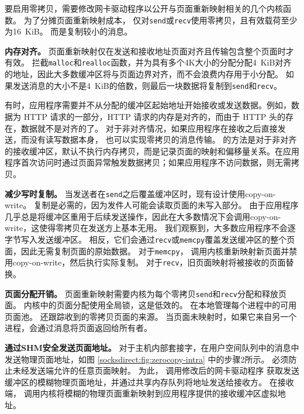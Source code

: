 

要启用零拷贝，需要修改网卡驱动程序以公开与页面重新映射相关的几个内核函数。
为了分摊页面重新映射成本，\libipc{} 仅对\texttt {send}或\texttt {recv}使用零拷贝，且有效载荷至少为16~KiB。
而是复制较小的消息。

\textbf {内存对齐。}
页面重新映射仅在发送和接收地址页面对齐且传输包含整个页面时才有效。
\libipc{} 拦截\texttt {malloc}和\texttt {realloc}函数，并为具有多个4K大小的分配分配4~KiB对齐的地址，因此大多数缓冲区将与页面边界对齐，而不会浪费内存用于小分配。
如果发送消息的大小不是4~KiB的倍数，则最后一块数据将复制到\texttt {send}和\texttt {recv}。

有时，应用程序需要并不从分配的缓冲区起始地址开始接收或发送数据。例如，数据为 HTTP 请求的一部分，HTTP 请求的内存是对齐的，而由于 HTTP 头的存在，数据就不是对齐的了。
对于非对齐情况，如果应用程序在接收之后直接发送，而没有读写数据本身，\sys{} 也可以实现零拷贝的消息传输。\sys{} 的方法是对于非对齐的接收缓冲区，默认不执行内存拷贝，而是记录页面的映射和偏移量关系。在应用程序首次访问时通过页面异常触发数据拷贝；如果应用程序不访问数据，则无需拷贝。



\textbf{减少写时复制。}
当发送者在\texttt {send}之后覆盖缓冲区时，现有设计使用copy-on-write。
复制是必需的，因为发件人可能会读取页面的未写入部分。
由于应用程序几乎总是将缓冲区重用于后续发送操作，因此在大多数情况下会调用copy-on-write，这使得零拷贝在发送方上基本无用。
我们观察到，大多数应用程序不会逐字节写入发送缓冲区。 相反，它们会通过\texttt {recv}或\texttt {memcpy}覆盖发送缓冲区的整个页面，因此无需复制页面的原始数据。
对于\texttt {memcpy}，\libipc{} 调用内核重新映射新页面并禁用copy-on-write，然后执行实际复制。
对于\texttt {recv}，旧页面映射将被接收的页面替换。


\textbf {页面分配开销。}
页面重新映射需要内核为每个零拷贝\texttt {send}和\texttt {recv}分配和释放页面。
内核中的页面分配使用全局锁，这是低效的。 \libipc {}在本地管理每个进程中的可用页面池。
\libipc {}还跟踪收到的零拷贝页面的来源。
当页面未映射时，如果它来自另一个进程，\libipc {}会通过消息将页面返回给所有者。

\textbf {通过SHM安全发送页面地址。}
对于主机内部套接字，在用户空间队列中的消息中发送物理页面地址，如图 \ref {socksdirect:fig:zerocopy-intra} 中的步骤2所示。
\sys{} 必须防止未经发送端允许的任意页面映射。
为此，\libipc {} 调用修改后的网卡驱动程序
获取发送缓冲区的模糊物理页面地址，并通过共享内存队列将地址发送给接收方。
在接收端，\libipc {} 调用内核将模糊的物理页面重新映射到应用程序提供的接收缓冲区虚拟地址。

